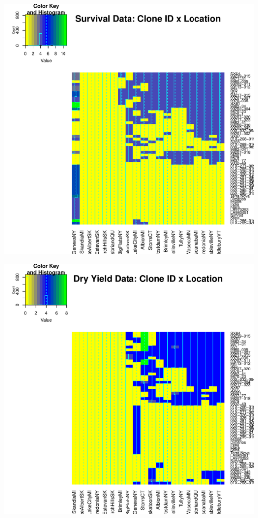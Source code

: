 \documentclass{article}\usepackage[]{graphicx}\usepackage[]{color}
\makeatletter
\def\maxwidth{ %
  \ifdim\Gin@nat@width>\linewidth
    \linewidth
  \else
    \Gin@nat@width
  \fi
}
\newenvironment{knitrout}{}{} %
\makeatother
\begin{document}
\begin{knitrout}
\color{fgcolor}

{\centering \includegraphics[width=\maxwidth]{figure/HeatmapSurvivalYield-1} 

}




{\centering \includegraphics[width=\maxwidth]{figure/HeatmapSurvivalYield-2} 

}
\end{knitrout}
\end{document}
